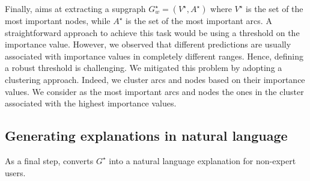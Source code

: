 Finally, \acronym{} aims at extracting a supgraph $G_w^\star = (V^\star,A^\star)$ where $V^\star$ is the set of the most important nodes, while $A^\star$ is the set of the most important arcs. A straightforward approach to achieve this task would be using a threshold on the importance value.
However, we observed that different predictions are usually associated with importance values in completely different ranges. Hence, defining a robust threshold is challenging. We mitigated this problem by adopting a clustering approach. Indeed, we cluster arcs and nodes based on their importance values.
We consider as the most important arcs and nodes the ones in the cluster associated with the highest importance values.








\subsection{Generating explanations in natural language}

As a final step, \acronym{} converts $G^\star$ into a natural language explanation for non-expert users.

